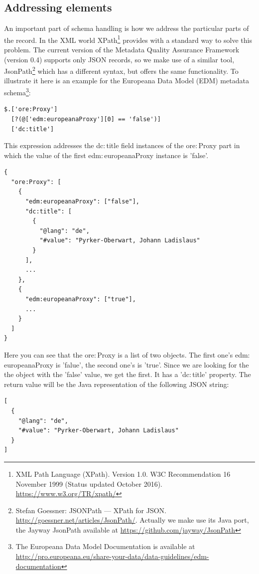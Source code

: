 \subsection{Addressing elements}

An important part of schema handling is how we address the particular parts of the record. In the XML world XPath\footnote{XML Path Language (XPath). Version 1.0. W3C Recommendation 16 November 1999 (Status updated October 2016). \url{https://www.w3.org/TR/xpath/}} provides with a standard way to solve this problem. The current version of the Metadata Quality Assurance Framework (version 0.4) supports only JSON records, so we make use of a similar tool, JsonPath\footnote{Stefan Goessner: JSONPath --- XPath for JSON. \url{http://goessner.net/articles/JsonPath/}. Actually we make use its Java port, the Jayway JsonPath available at \url{https://github.com/jayway/JsonPath}} which has a different syntax, but offers the same functionality. To illustrate it here is an example for the Europeana Data Model (EDM) metadata schema\footnote{The Europeana Data Model Documentation is available at \url{http://pro.europeana.eu/share-your-data/data-guidelines/edm-documentation}}:

\begin{lstlisting}[caption=A JSON path example]
$.['ore:Proxy']
  [?(@['edm:europeanaProxy'][0] == 'false')]
  ['dc:title']
\end{lstlisting}

This expression addresses the dc$:$title field instances of the ore$:$Proxy part in which the value of the first edm$:$europeanaProxy instance is 'false'.

\begin{lstlisting}[caption=An excerpt of an EDM metadata record]
{
  "ore:Proxy": [
    {
      "edm:europeanaProxy": ["false"],
      "dc:title": [
        {
          "@lang": "de",
          "#value": "Pyrker-Oberwart, Johann Ladislaus"
        }
      ],
      ...
    },
    {
      "edm:europeanaProxy": ["true"],
      ...
    }
  ]
}
\end{lstlisting}

Here you can see that the ore$:$Proxy is a list of two objects. The first one's edm$:$europeanaProxy is 'falue', the second one's is 'true'. Since we are looking for the the object with the 'false' value, we get the first. It has a 'dc$:$title' property. The return value will be the Java representation of the following JSON string:

\begin{lstlisting}[caption=The selected part of the record]
[
  {
    "@lang": "de",
    "#value": "Pyrker-Oberwart, Johann Ladislaus"
  }
]
\end{lstlisting}

